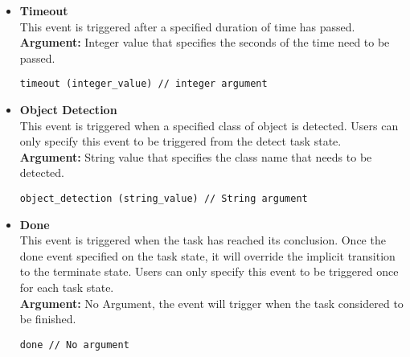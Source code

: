\begin{itemize}
    \item \textbf{Timeout}\\
    This event is triggered after a specified duration of time has passed.\\
    \textbf{Argument:} Integer value that specifies the seconds of the time need to be passed.
    \begin{lstlisting}[style=customgo] 
    timeout (integer_value) // integer argument
    \end{lstlisting}  
    
    \item \textbf{Object Detection}\\
    This event is triggered when a specified class of object is detected. Users can only specify this event to be triggered from the detect task state.\\
    \textbf{Argument:} String value that specifies the class name that needs to be detected.
    \begin{lstlisting}[style=customgo] 
    object_detection (string_value) // String argument
    \end{lstlisting}  

    \item \textbf{Done}\\
    This event is triggered when the task has reached its conclusion. Once the done event specified on the task state, it will override the implicit transition to the terminate state. Users can only specify this event to be triggered once for each task state.\\
    \textbf{Argument:} No Argument, the event will trigger when the task considered to be finished.
    \begin{lstlisting}[style=customgo] 
    done // No argument
    \end{lstlisting}  
\end{itemize}




